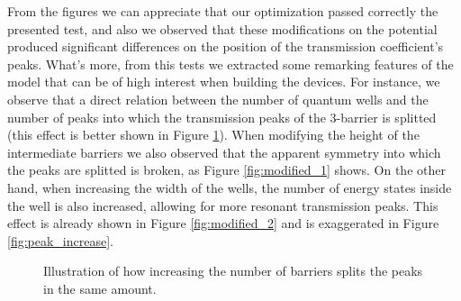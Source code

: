 \documentclass[12pt,a4paper,onecolumn]{article}
\theoremstyle{definition}
\theoremstyle{plain}
\begin{document}
From the figures we can appreciate that our optimization passed correctly the presented test, and also we observed that these modifications on the potential produced significant differences on the position of the transmission coefficient's peaks. What's more, from this tests we extracted some remarking features of the model that can be of high interest when building the devices. For instance, we observe that a direct relation between the number of quantum wells and the number of peaks into which the transmission peaks of the 3-barrier is splitted (this effect is better shown in Figure \ref {fig:peak_split}). When modifying the height of the intermediate barriers we also observed that the apparent symmetry into which the peaks are splitted is broken, as Figure \ref {fig:modified_1} shows. On the other hand, when increasing the width of the wells, the number of energy states inside the well is also increased, allowing for more resonant transmission peaks. This effect is already shown in Figure \ref {fig:modified_2} and is exaggerated in Figure \ref {fig:peak_increase}.

\begin{figure}[H]
\centering
	\caption{Illustration of how increasing the number of barriers splits the peaks in the same amount.} 
	\label{fig:peak_split}
\end{figure}
\end{document}
